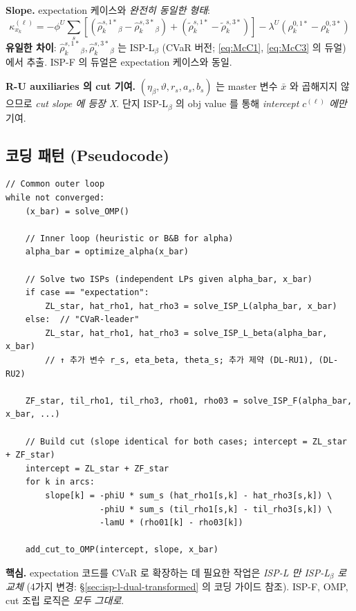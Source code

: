 \documentclass[11pt]{article}
\theoremstyle{plain}
\theoremstyle{remark}
\begin{document}
\textbf{Slope.} expectation 케이스와 \emph{완전히 동일한 형태}:
\begin{equation}\label{eq:cut-slope-CVaR}
\boxed{\;
\kappa_{x_k}^{(\ell)} = -\phi^U \textstyle\sum_s [(\hat\rho_k^{s,1*}_\beta - \hat\rho_k^{s,3*}_\beta) + (\tilde\rho_k^{s,1*} - \tilde\rho_k^{s,3*})] - \lambda^U(\rho_k^{0,1*} - \rho_k^{0,3*})
\;}
\end{equation}
\textbf{유일한 차이}: $\hat\rho_k^{s,1*}_\beta, \hat\rho_k^{s,3*}_\beta$ 는 ISP-L$_\beta$ (CVaR 버전; \eqref{eq:McC1}, \eqref{eq:McC3} 의 듀얼) 에서 추출. ISP-F 의 듀얼은 expectation 케이스와 동일.

\textbf{R-U auxiliaries 의 cut 기여.} $(\eta_\beta, \vartheta, r_s, a_s, b_s)$ 는 master 변수 $\bar x$ 와 곱해지지 않으므로 \emph{cut slope 에 등장 X}. 단지 ISP-L$_\beta$ 의 obj value 를 통해 \emph{intercept $c^{(\ell)}$ 에만} 기여.

\subsection{코딩 패턴 (Pseudocode)}

\begin{verbatim}
// Common outer loop
while not converged:
    (x_bar) = solve_OMP()
    
    // Inner loop (heuristic or B&B for alpha)
    alpha_bar = optimize_alpha(x_bar)
    
    // Solve two ISPs (independent LPs given alpha_bar, x_bar)
    if case == "expectation":
        ZL_star, hat_rho1, hat_rho3 = solve_ISP_L(alpha_bar, x_bar)
    else:  // "CVaR-leader"
        ZL_star, hat_rho1, hat_rho3 = solve_ISP_L_beta(alpha_bar, x_bar)
        // ↑ 추가 변수 r_s, eta_beta, theta_s; 추가 제약 (DL-RU1), (DL-RU2)
    
    ZF_star, til_rho1, til_rho3, rho01, rho03 = solve_ISP_F(alpha_bar, x_bar, ...)
    
    // Build cut (slope identical for both cases; intercept = ZL_star + ZF_star)
    intercept = ZL_star + ZF_star
    for k in arcs:
        slope[k] = -phiU * sum_s (hat_rho1[s,k] - hat_rho3[s,k]) \
                   -phiU * sum_s (til_rho1[s,k] - til_rho3[s,k]) \
                   -lamU * (rho01[k] - rho03[k])
    
    add_cut_to_OMP(intercept, slope, x_bar)
\end{verbatim}

\textbf{핵심.} expectation 코드를 CVaR 로 확장하는 데 필요한 작업은 \emph{ISP-L 만 ISP-L$_\beta$ 로 교체} (4가지 변경: §\ref{sec:isp-l-dual-transformed} 의 코딩 가이드 참조). ISP-F, OMP, cut 조립 로직은 \emph{모두 그대로}.
\end{document}
